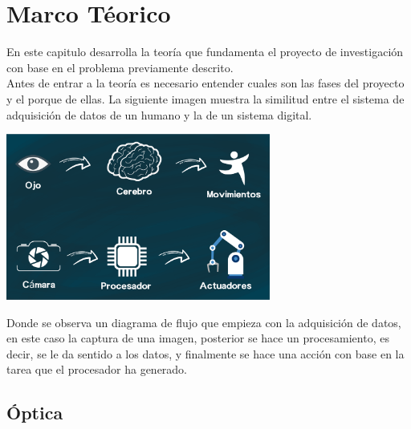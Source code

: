 \chapter{Marco Téorico}
En este capitulo desarrolla la teoría que fundamenta el proyecto de investigación con base
en el problema previamente descrito.\\
Antes de entrar a la teoría es necesario entender cuales son las fases del proyecto y
el porque de ellas.
La siguiente imagen muestra la similitud entre el sistema de adquisición de datos
de un humano y la de un sistema digital.

\begin{center}
    \includegraphics[width=0.65\textwidth]{Capitulo2/Fig1.eps}
    \label{Fig1}
\end{center}

Donde se observa un diagrama de flujo que empieza con la adquisición de datos, en este
caso la captura de una imagen, posterior se hace un procesamiento, es decir, se le da
sentido a los datos, y finalmente se hace una acción con base en la tarea que el procesador
ha generado.


\section{Óptica}

